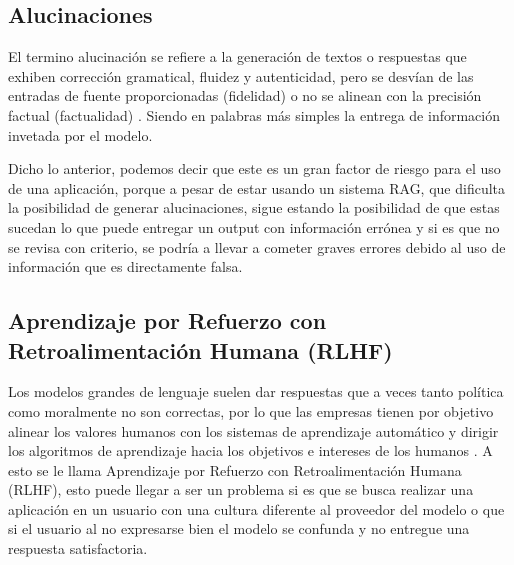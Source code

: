 \subsection{Alucinaciones}

El termino alucinación se refiere a la generación de textos o respuestas que exhiben corrección gramatical, fluidez y autenticidad,
pero se desvían de las entradas de fuente proporcionadas (fidelidad) o no se alinean con la precisión factual (factualidad) \cite{alucionacion1}.
Siendo en palabras más simples la entrega de información invetada por el modelo.

Dicho lo anterior, podemos decir que este es un gran factor de riesgo para el uso de una aplicación, porque a pesar de estar usando un 
sistema RAG, que dificulta la posibilidad de generar alucinaciones, sigue estando la posibilidad de que estas sucedan lo que puede 
entregar un output con información errónea y si es que no se revisa con criterio, se podría a llevar a cometer graves errores debido 
al uso de información que es directamente falsa.

\subsection{Aprendizaje por Refuerzo con Retroalimentación Humana (RLHF)}

Los modelos grandes de lenguaje suelen dar respuestas que a veces tanto política como moralmente no son correctas, por lo que 
las empresas tienen por objetivo alinear los valores humanos con los sistemas de aprendizaje automático y dirigir los algoritmos 
de aprendizaje hacia los objetivos e intereses de los humanos \cite{RLHF}. A esto se le llama Aprendizaje por Refuerzo con 
Retroalimentación Humana (RLHF), esto puede llegar a ser un problema si es que se busca realizar una aplicación en un usuario con una 
cultura diferente al proveedor del modelo o que si el usuario al no expresarse bien el modelo se confunda y no entregue una respuesta 
satisfactoria.
